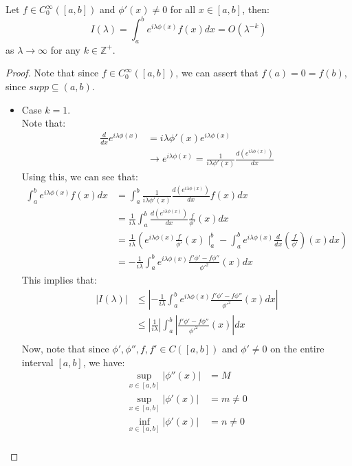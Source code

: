 \begin{proposition}{}
  Let $f\in C^{\infty}_{0}([a,b])$ and $\phi'(x)\neq 0$ for all $x\in[a,b]$, then:
  $$I(\lambda)=\int_{a}^{b}e^{i\lambda \phi(x)}f(x)dx=O(\lambda^{-k})$$
  as $\lambda \rightarrow \infty$ for any $k\in\mathbb{Z}^+$.
\end{proposition} 
\begin{proof}{}  
  Note that since $f\in C^{\infty}_{0}([a,b])$, we can assert that $f(a)=0=f(b)$, since $supp \subseteq (a,b)$.
  \begin{itemize}
    \item Case $k=1$.\\
      Note that:
      \begin{align*}
        \frac{d}{dx}e^{i\lambda\phi(x)}&=i\lambda\phi'(x)e^{i\lambda\phi(x)}\\
        &\rightarrow e^{i\lambda\phi(x)}=\frac{1}{i\lambda\phi'(x)}\frac{d(e^{i\lambda\phi(x)})}{dx}
      \end{align*}
      Using this, we can see that:
      \begin{align*}
        \int_{a}^{b} e^{i\lambda\phi(x)}f(x)dx &=\int_{a}^{b}\frac{1}{i\lambda\phi'(x)}\frac{d(e^{i\lambda\phi(x)})}{dx}f(x)dx\\
        &= \frac{1}{i\lambda}\int_{a}^{b}\frac{d(e^{i\lambda\phi(x)})}{dx}\frac{f}{\phi'}(x)dx\\
        &= \frac{1}{i\lambda}\left(e^{i\lambda\phi(x)}\frac{f}{\phi'}(x)\mid^{b}_{a}-\int_{a}^{b}e^{i\lambda\phi(x)}\frac{d}{dx}(\frac{f}{\phi'})(x)dx\right)\\
        &= -\frac{1}{i\lambda}\int_{a}^{b}e^{i\lambda\phi(x)}\frac{f'\phi'-f\phi''}{\phi'^2}(x)dx
      \end{align*}
      This implies that:
      \begin{align*}
        |I(\lambda)|&\leq \left|-\frac{1}{i\lambda}\int_{a}^{b}e^{i\lambda\phi(x)}\frac{f'\phi'-f\phi''}{\phi'^2}(x)dx\right|\\
        &\leq \left|\frac{1}{i\lambda}\right|\int_{a}^{b}\left|\frac{f'\phi'-f\phi''}{\phi'^2}(x)\right|dx\\
      \end{align*}
      Now, note that since $\phi',\phi'',f,f'\in C([a,b])$ and $\phi'\neq 0$ on the entire interval $[a,b]$, we have:
      \begin{align*}
        \sup_{x\in[a,b]}|\phi''(x)|&=M\\
        \sup_{x\in[a,b]}|\phi'(x)|&=m\neq0\\
        \inf_{x\in[a,b]}|\phi'(x)|&=n\neq0\\

\end{align*}
\end{itemize}
\end{proof}
